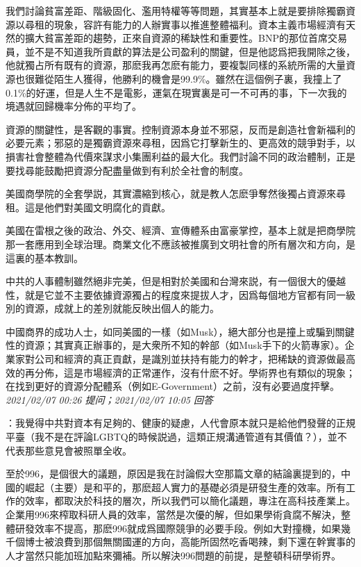 \documentclass[twocolumn]{ctexart}
\begin{document}
我們討論貧富差距、階級固化、濫用特權等等問題，其實基本上就是要排除獨霸資源以尋租的現象，容許有能力的人辦實事以推進整體福利。資本主義市場經濟有天然的擴大貧富差距的趨勢，正來自資源的稀缺性和重要性。BNP的那位首席交易員，並不是不知道我所貢獻的算法是公司盈利的關鍵，但是他認爲把我開除之後，他就獨占所有既有的資源，那麽我再怎麽有能力，要複製同樣的系統所需的大量資源也很難從陌生人獲得，他勝利的機會是99.9\%。雖然在這個例子裏，我撞上了0.1\%的好運，但是人生不是電影，運氣在現實裏是可一不可再的事，下一次我的境遇就回歸機率分佈的平均了。

資源的關鍵性，是客觀的事實。控制資源本身並不邪惡，反而是創造社會新福利的必要元素；邪惡的是獨霸資源來尋租，因爲它打擊新生的、更高效的競爭對手，以損害社會整體為代價來謀求小集團利益的最大化。我們討論不同的政治體制，正是要找尋能鼓勵把資源分配盡量做到有利於全社會的制度。

美國商學院的全套學説，其實濃縮到核心，就是教人怎麽爭奪然後獨占資源來尋租。這是他們對美國文明腐化的貢獻。

美國在雷根之後的政治、外交、經濟、宣傳體系由富豪掌控，基本上就是把商學院那一套應用到全球治理。商業文化不應該被推廣到文明社會的所有層次和方向，是這裏的基本教訓。

中共的人事體制雖然絕非完美，但是相對於美國和台灣來説，有一個很大的優越性，就是它並不主要依據資源獨占的程度來提拔人才，因爲每個地方官都有同一級別的資源，成就上的差別就能反映出個人的能力。

中國商界的成功人士，如同美國的一樣（如Musk），絕大部分也是撞上或騙到關鍵性的資源；其實真正辦事的，是大衆所不知的幹部（如Musk手下的火箭專家）。企業家對公司和經濟的真正貢獻，是識別並扶持有能力的幹才，把稀缺的資源做最高效的再分佈，這是市場經濟的正常運作，沒有什麽不好。學術界也有類似的現象；在找到更好的資源分配體系（例如E-Government）之前，沒有必要過度抨擊。
\\

\textit{\hfill\noindent\small 2021/02/07 00:26 提问；2021/02/07 10:05 回答}

：我覺得中共對資本有足夠的、健康的疑慮，人代會原本就只是給他們發聲的正規平臺（我不是在評論LGBTQ的時候説過，這類正規溝通管道有其價值？），並不代表那些意見會被照單全收。

至於996，是個很大的議題，原因是我在討論假大空那篇文章的結論裏提到的，中國的崛起（主要）是和平的，那麽超人實力的基礎必須是研發生產的效率。所有工作的效率，都取決於科技的層次，所以我們可以簡化議題，專注在高科技產業上。企業用996來榨取科研人員的效率，當然是次優的解，但如果學術貪腐不解決，整體研發效率不提高，那麽996就成爲國際競爭的必要手段。例如大對撞機，如果幾千個博士被浪費到那個無關國運的方向，高能所固然吃香喝辣，剩下還在幹實事的人才當然只能加班加點來彌補。所以解決996問題的前提，是整頓科研學術界。
\end{document}
